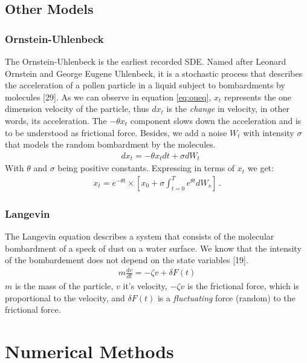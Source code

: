 \documentclass[12pt,twoside]{reedthesis}
\theoremstyle{definition}
\theoremstyle{definition}
\theoremstyle{remark}
\begin{document}
  \subsection{Other Models}\label{other-models}
  
  \subsubsection{Ornstein-Uhlenbeck}\label{ornstein-uhlenbeck}
  
  The Ornstein-Uhlenbeck is the earliest recorded SDE. Named after Leonard
  Ornstein and George Eugene Uhlenbeck, it is a stochastic process that
  describes the acceleration of a pollen particle in a liquid subject to
  bombardments by molecules {[}29{]}. As we can observe in equation
  \eqref{eq:oueq}, \(x_t\) represents the one dimension velocity of the
  particle, thus \(dx_t\) is the \emph{change} in velocity, in other
  words, its acceleration. The \(- \theta x_t\) component slows down the
  acceleration and is to be understood as frictional force. Besides, we
  add a noise \(W_t\) with intensity \(\sigma\) that models the random
  bombardment by the molecules.
  \begin{align} 
  \label{eq:oueq}
  &d x_t = - \theta x_t dt + \sigma d W_t
  \end{align}
  With \(\theta\) and \(\sigma\) being positive constants. Expressing in
  terms of \(x_t\) we get:
  \begin{align}
  x_t = e^{-\theta t} \times \left[ x_0  + \sigma \int_{t=0}^{T} e^{\theta t} d W_s \right] \,.
  \end{align}
  \subsubsection{Langevin}\label{langevin}
  
  The Langevin equation describes a system that consists of the molecular
  bombardment of a speck of dust on a water surface. We know that the
  intensity of the bombardement does not depend on the state variables
  {[}19{]}.
  \begin{align}
  m \frac{dv}{dt} = -\zeta v + \delta F (t) 
  \end{align}
  \(m\) is the mass of the particle, \(v\) it's velocity, \(-\zeta v\) is
  the frictional force, which is proportional to the velocity, and
  \(\delta F (t)\) is a \emph{fluctuating} force (random) to the
  frictional force.
  
  \section{Numerical Methods}\label{numerical-methods}
  
\end{document}
